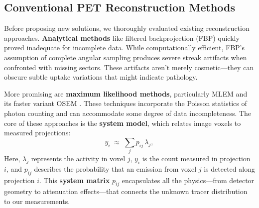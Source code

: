 \documentclass[
reprint,
superscriptaddress,
nofootinbib,
amsmath,amssymb,
aps,
prd,
]{revtex4-2}
\begin{document}
\subsection{Conventional PET Reconstruction Methods}

Before proposing new solutions, we thoroughly evaluated existing reconstruction approaches. \textbf{Analytical methods} like filtered backprojection (FBP) quickly proved inadequate for incomplete data. While computationally efficient, FBP's assumption of complete angular sampling produces severe streak artifacts when confronted with missing sectors. These artifacts aren't merely cosmetic—they can obscure subtle uptake variations that might indicate pathology.

More promising are \textbf{maximum likelihood methods}, particularly MLEM and its faster variant OSEM \cite{363108}. These techniques incorporate the Poisson statistics of photon counting and can accommodate some degree of data incompleteness. The core of these approaches is the \textbf{system model}, which relates image voxels to measured projections:
\begin{equation}
    y_i \;\approx\; \sum_{j} p_{ij}\,\lambda_j,
\end{equation}
Here, $\lambda_j$ represents the activity in voxel $j$, $y_i$ is the count measured in projection $i$, and $p_{ij}$ describes the probability that an emission from voxel $j$ is detected along projection $i$. This \textbf{system matrix} $p_{ij}$ encapsulates all the physics—from detector geometry to attenuation effects—that connects the unknown tracer distribution to our measurements.
\end{document}

